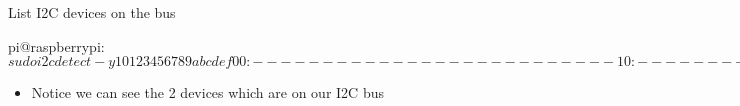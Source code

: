 \begin{frame}
   {List I2C devices on the bus}

   \begin{raw}
pi@raspberrypi:~$ sudo i2cdetect -y 1
     0  1  2  3  4  5  6  7  8  9  a  b  c  d  e  f
00:          -- -- -- -- -- -- -- -- -- -- -- -- -- 
10: -- -- -- -- -- -- -- -- -- -- -- -- -- -- -- -- 
20: -- -- -- -- -- -- -- -- -- -- -- -- -- -- -- -- 
30: -- -- -- -- -- -- -- -- -- 39 -- -- -- -- -- -- 
40: -- -- -- -- -- -- -- -- -- -- -- -- -- -- -- -- 
50: -- -- -- -- -- -- -- -- -- -- -- -- -- -- -- -- 
60: -- -- -- -- -- -- -- -- -- -- -- -- -- -- -- -- 
70: -- -- -- -- -- -- 76 --                         
pi@raspberrypi:~$ 
   \end{raw}
   \begin{itemize}
      \item Notice we can see the 2 devices which are on our I2C bus
   \end{itemize}
\end{frame}

\cprotect\note{


}

